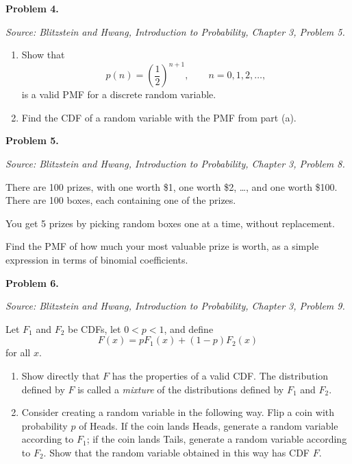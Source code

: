 \documentclass[11pt]{article}
\newcommand{\source}[1]{%
    \vspace{0.15cm}
    {\small\textit{Source: Blitzstein and Hwang, \textit{Introduction to Probability}, Chapter 3, Problem #1.}}
}
\begin{document}
\vfill


\newpage


\begin{problemheader}
\textbf{Problem 4. }
\end{problemheader}
\source{5}

\begin{enumerate}[label=(\alph*), leftmargin=*]
    \item Show that
    \[
    p(n)=\left(\frac12\right)^{n+1},
    \qquad n=0,1,2,\dots,
    \]
    is a valid PMF for a discrete random variable.

    \item Find the CDF of a random variable with the PMF from part (a).
\end{enumerate}

\vfill


\newpage


\begin{problemheader}
\textbf{Problem 5. }
\end{problemheader}
\source{8}

There are 100 prizes, with one worth \$1, one worth \$2, \dots, and one worth \$100. There are 100 boxes, each containing one of the prizes.

You get 5 prizes by picking random boxes one at a time, without replacement.

Find the PMF of how much your most valuable prize is worth, as a simple expression in terms of binomial coefficients.

\vfill


\newpage


\begin{problemheader}
\textbf{Problem 6. }
\end{problemheader}
\source{9}

Let $F_1$ and $F_2$ be CDFs, let $0<p<1$, and define
\[
F(x)=pF_1(x)+(1-p)F_2(x)
\]
for all $x$.

\begin{enumerate}[label=(\alph*), leftmargin=*]
    \item Show directly that $F$ has the properties of a valid CDF. The distribution defined by $F$ is called a \emph{mixture} of the distributions defined by $F_1$ and $F_2$.

    \item Consider creating a random variable in the following way. Flip a coin with probability $p$ of Heads. If the coin lands Heads, generate a random variable according to $F_1$; if the coin lands Tails, generate a random variable according to $F_2$. Show that the random variable obtained in this way has CDF $F$.
\end{enumerate}
\end{document}
